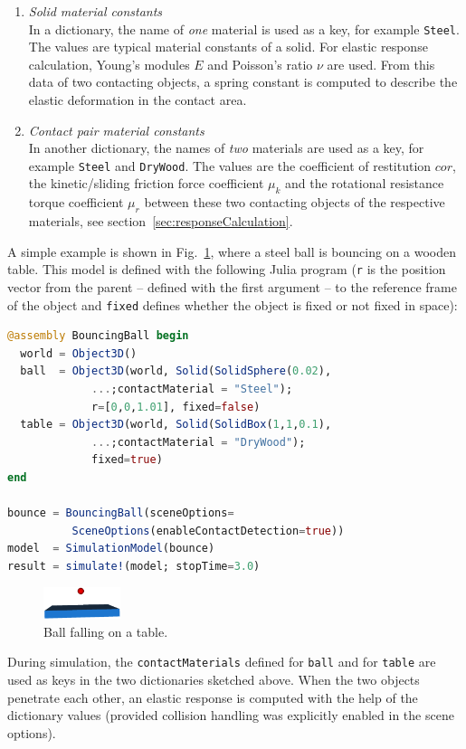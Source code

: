 \begin{enumerate}
\item \emph{Solid material constants}\\
      In a dictionary, the name of \emph{one} material is used as a key, for example \texttt{Steel}. 
      The values are typical material constants of a solid. For elastic response calculation,
      Young's modules $E$ and Poisson's ratio $\nu$ are used. From this data of two contacting
      objects, a spring constant is computed to describe the elastic deformation in the contact area.

\item \emph{Contact pair material constants}\\
      In another dictionary, the names of \emph{two} materials are used as a key, for example \texttt{Steel} 
      and \texttt{DryWood}. The values are the coefficient of restitution $cor$, 
      the kinetic/sliding friction force coefficient $\mu_k$ and the 
      rotational resistance torque coefficient $\mu_r$ between these two contacting
      objects of the respective materials, see section~\ref{sec:responseCalculation}.
\end{enumerate}  

A simple example is shown in Fig.~\ref{fig:bouncingBall}, where a
steel ball is bouncing on a wooden table.
This model is defined with the following Julia program
(\texttt{r} is the position vector from the parent -- defined with the first
argument -- to the reference frame of the object and \texttt{fixed} defines
whether the object is fixed or not fixed in space):
\newpage

\begin{lstlisting}[language = Julia]
@assembly BouncingBall begin
  world = Object3D()
  ball  = Object3D(world, Solid(SolidSphere(0.02),
		     ...;contactMaterial = "Steel");
		     r=[0,0,1.01], fixed=false)
  table = Object3D(world, Solid(SolidBox(1,1,0.1),
		     ...;contactMaterial = "DryWood"); 
		     fixed=true)
end

bounce = BouncingBall(sceneOptions=
          SceneOptions(enableContactDetection=true))
model  = SimulationModel(bounce)
result = simulate!(model; stopTime=3.0)
\end{lstlisting}


%
\begin{figure}[tb]
	\centering
	\includegraphics[width=0.2\textwidth]{figures/bouncingBall.png}
	\caption{Ball falling on a table.}
	\label{fig:bouncingBall}
\end{figure}
%
During simulation, the \texttt{contactMaterials} defined for
\texttt{ball} and for \texttt{table} are used as keys in the two
dictionaries sketched above. 
When the two objects penetrate each other,
an elastic response is computed with the help of the dictionary values 
(provided collision handling was explicitly enabled in the scene options).

